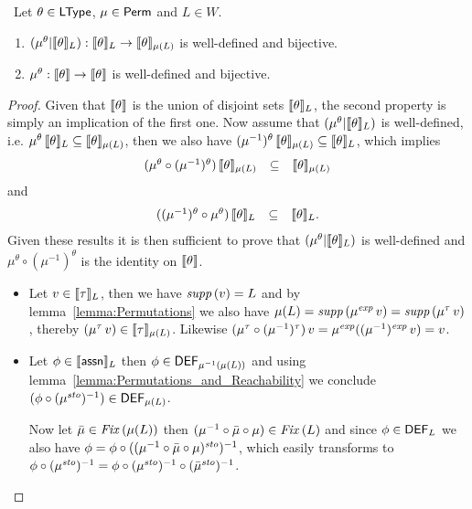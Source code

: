 \documentclass[12pt,a4paper]{report}
\newcommand{\sexp}{\nstyle{exp}}
\newcommand{\ssto}{\nstyle{sto}}
\newcommand{\DEF}{\sstyle{DEF}}
\newcommand{\Fix}[1]{\nstyle{Fix}\,(#1)}
\begin{document}
\begin{lemma} \
  Let $\theta \in \mathsf{LType}$, $\mu\in\mathsf{Perm}$ and $L\in W$.
  \begin{enumerate}
    \item $(\mu^\theta|\llbracket\theta\rrbracket_L): \llbracket\theta\rrbracket_L \to \llbracket\theta\rrbracket_{\mu(L)}$ is
          well-defined and bijective.
    \item $\mu^\theta: \llbracket\theta\rrbracket \to \llbracket\theta\rrbracket$ is well-defined and bijective.
  \end{enumerate}
\end{lemma}

\begin{proof}
  Given that $\llbracket\theta\rrbracket$ is the union of disjoint sets $\llbracket\theta\rrbracket_L$, the second
  property is simply an implication of the first one. Now assume that $(\mu^\theta|\llbracket\theta\rrbracket_L)$
  is well-defined, i.e. $\mu^\theta\,\llbracket\theta\rrbracket_L \subseteq \llbracket\theta\rrbracket_{\mu(L)}$, then
  we also have $(\mu^{-1})^\theta\,\llbracket\theta\rrbracket_{\mu(L)} \subseteq \llbracket\theta\rrbracket_L$, which
  implies
  \[\begin{array}{rcl}
    (\mu^\theta \circ (\mu^{-1})^\theta)\,\llbracket\theta\rrbracket_{\mu(L)} &\subseteq& \llbracket\theta\rrbracket_{\mu(L)}
  \end{array}\]
  and
  \[\begin{array}{rcl}
    ((\mu^{-1})^\theta \circ \mu^\theta)\,\llbracket\theta\rrbracket_L &\subseteq& \llbracket\theta\rrbracket_L.
  \end{array}\]
  Given these results it is then sufficient to prove that $(\mu^\theta|\llbracket\theta\rrbracket_L)$ is
  well-defined and $\mu^\theta \circ (\mu^{-1})^\theta$ is the identity on $\llbracket\theta\rrbracket$.
  \begin{itemize}
    \item Let $v \in \llbracket\tau\rrbracket_L$, then we have $\mathit{supp}\,(v) = L$ and by lemma~\ref{lemma:Permutations}
          we also have $\mu(L) = \supp{\mu^\sexp\,v} = \supp{\mu^\tau\,v}$, thereby
          $(\mu^\tau\,v) \in \llbracket\tau\rrbracket_{\mu(L)}$. Likewise
          $(\mu^\tau \circ(\mu^{-1})^\tau)\,v = \mu^\sexp((\mu^{-1})^\sexp\,v) = v$.

    \item Let $\phi \in \llbracket\mathsf{assn}\rrbracket_L$ then $\phi \in \DEF_{\mu^{-1}(\mu(L))}$ and using
          lemma~\ref{lemma:Permutations_and_Reachability} we conclude $(\phi\circ(\mu^\ssto)^{-1})\in\DEF_{\mu(L)}$.

          Now let $\bar{\mu}\in\Fix{\mu(L)}$ then $(\mu^{-1}\circ \bar{\mu} \circ \mu) \in \Fix{L}$ and since
          $\phi\in\DEF_L$ we also have $\phi = \phi \circ ((\mu^{-1}\circ \bar{\mu} \circ \mu)^\ssto)^{-1}$,
          which easily transforms to $\phi\circ (\mu^\ssto)^{-1} = \phi \circ (\mu^\ssto)^{-1} \circ (\bar{\mu}^\ssto)^{-1}$.


\end{itemize}
\end{proof}
\end{document}
